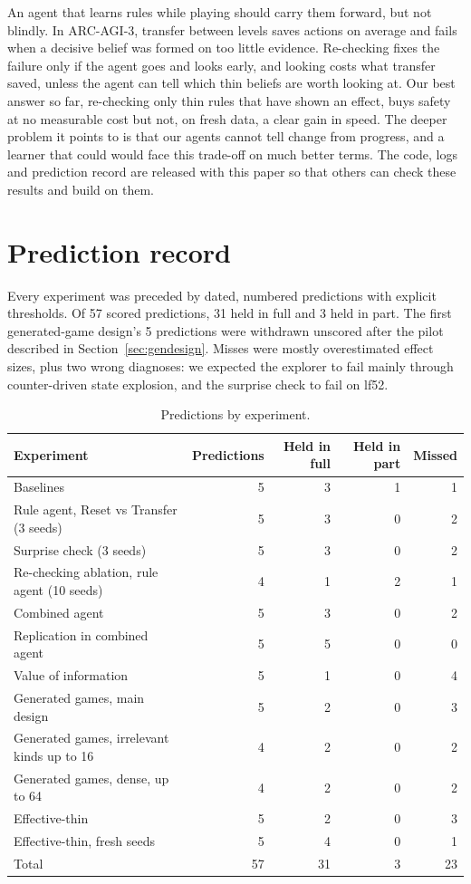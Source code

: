 \documentclass[11pt,a4paper]{article}
\begin{document}
An agent that learns rules while playing should carry them forward, but not blindly. In ARC-AGI-3, transfer between levels saves actions on average and fails when a decisive belief was formed on too little evidence. Re-checking fixes the failure only if the agent goes and looks early, and looking costs what transfer saved, unless the agent can tell which thin beliefs are worth looking at. Our best answer so far, re-checking only thin rules that have shown an effect, buys safety at no measurable cost but not, on fresh data, a clear gain in speed. The deeper problem it points to is that our agents cannot tell change from progress, and a learner that could would face this trade-off on much better terms. The code, logs and prediction record are released with this paper so that others can check these results and build on them.

\appendix

\section{Prediction record}
\label{app:predictions}

Every experiment was preceded by dated, numbered predictions with explicit thresholds. Of 57 scored predictions, 31 held in full and 3 held in part. The first generated-game design's 5 predictions were withdrawn unscored after the pilot described in Section~\ref{sec:gendesign}. Misses were mostly overestimated effect sizes, plus two wrong diagnoses: we expected the explorer to fail mainly through counter-driven state explosion, and the surprise check to fail on lf52.

\begin{table}[ht]
\centering
\caption{Predictions by experiment.}
\label{tab:predictions}
\small
\begin{tabular}{@{}lrrrr@{}}
\toprule
Experiment & Predictions & Held in full & Held in part & Missed \\
\midrule
Baselines & 5 & 3 & 1 & 1 \\
Rule agent, Reset vs Transfer (3 seeds) & 5 & 3 & 0 & 2 \\
Surprise check (3 seeds) & 5 & 3 & 0 & 2 \\
Re-checking ablation, rule agent (10 seeds) & 4 & 1 & 2 & 1 \\
Combined agent & 5 & 3 & 0 & 2 \\
Replication in combined agent & 5 & 5 & 0 & 0 \\
Value of information & 5 & 1 & 0 & 4 \\
Generated games, main design & 5 & 2 & 0 & 3 \\
Generated games, irrelevant kinds up to 16 & 4 & 2 & 0 & 2 \\
Generated games, dense, up to 64 & 4 & 2 & 0 & 2 \\
Effective-thin & 5 & 2 & 0 & 3 \\
Effective-thin, fresh seeds & 5 & 4 & 0 & 1 \\
\midrule
Total & 57 & 31 & 3 & 23 \\
\bottomrule
\end{tabular}
\end{table}
\end{document}
